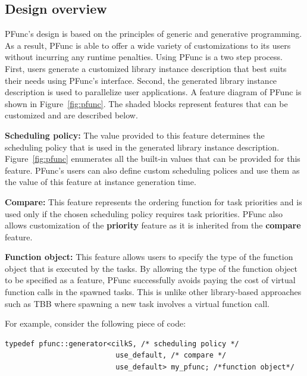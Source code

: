 \documentclass{sig-alternate}
\begin{document}
\subsection{Design overview}
\label{sec:design}
PFunc's design is based on the principles of generic and generative
programming. As a result, PFunc is able to offer a wide variety of
customizations to its users without incurring any runtime penalties.  Using
PFunc is a two step process. First, users generate a customized library
instance description that best suits their needs using PFunc's 
interface. Second, the generated library instance description is used to
parallelize user applications. A feature diagram of PFunc is shown in
Figure~\ref{fig:pfunc}. The shaded blocks represent features that
can be customized and are described below.
\begin{list}{}{\leftmargin=1em}
\item \textbf{Scheduling policy:}
The value provided to this feature determines the scheduling policy that is
used in the generated library instance description.  Figure~\ref{fig:pfunc}
enumerates all the built-in values that can be provided for this feature.
PFunc's users can also define custom scheduling polices and use them as the
value of this feature at instance generation time.
\item \textbf{Compare:}
This feature represents the ordering function for task priorities and is used
only if the chosen scheduling policy requires task priorities. PFunc also
allows customization of the \textbf{priority} feature as it is inherited from
the \textbf{compare} feature.
\item \textbf{Function object:}
This feature allows users to specify the type of the function object that is
executed by the tasks.  By allowing the type of the function object to be
specified as a feature, PFunc successfully avoids paying the cost of virtual
function calls in the spawned tasks. This is unlike other library-based
approaches such as TBB where spawning a new task involves a virtual function
call.  
\end{list}

For example, consider the following piece of code:

\begin{lstlisting}
typedef pfunc::generator<cilkS, /* scheduling policy */
                          use_default, /* compare */
                          use_default> my_pfunc; /*function object*/
\end{lstlisting}
\end{document}
